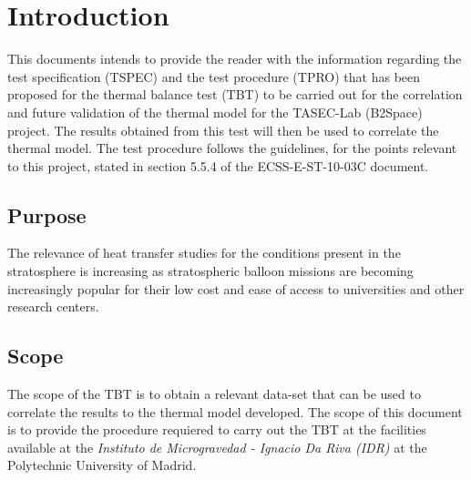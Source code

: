 \section{Introduction} \label{sec:Introduction}

This documents intends to provide the reader with the information regarding the test specification (TSPEC) and the test procedure (TPRO) that has been proposed for the thermal balance test (TBT) to be carried out for the correlation and future validation of the thermal model for the TASEC-Lab (B2Space) project. The results obtained from this test will then be used to correlate the thermal model.  The test procedure follows the guidelines, for the points relevant to this project, stated in section 5.5.4 of the ECSS-E-ST-10-03C document.

\subsection{Purpose} 
The relevance of heat transfer studies for the conditions present in the stratosphere is increasing as stratospheric balloon missions are becoming increasingly popular for their low cost and ease of access to universities and other research centers. 

\subsection{Scope}
The scope of the TBT is to obtain a relevant data-set that can be used to correlate the results to the thermal model developed. The scope of this document is to provide the procedure requiered to carry out the TBT at the facilities available at the \textit{Instituto de Microgravedad - Ignacio Da Riva (IDR)} at the Polytechnic University of Madrid.

